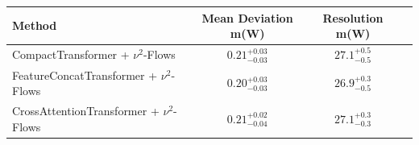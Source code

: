     \begin{tabular}{lccc}
        \toprule
        Method & Mean Deviation m(W) & Resolution m(W) \\
        \midrule
        CompactTransformer + $\nu^2$-Flows & $0.21_{-0.03}^{+0.03}$ & $27.1_{-0.5}^{+0.5}$ \\
        FeatureConcatTransformer + $\nu^2$-Flows & $0.20_{-0.03}^{+0.03}$ & $26.9_{-0.5}^{+0.3}$ \\
        CrossAttentionTransformer + $\nu^2$-Flows & $0.21_{-0.04}^{+0.02}$ & $27.1_{-0.3}^{+0.3}$ \\
        \bottomrule
    \end{tabular}